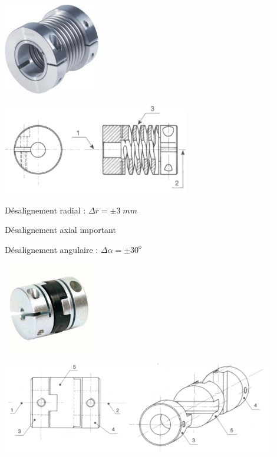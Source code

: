 \documentclass[11pt,oneside]{article}
\begin{document}
\noindent\begin{minipage}[c]{.25\linewidth}
\begin{center}
\includegraphics[height=4cm]{png/fig_15}
\end{center}
\end{minipage} \hfill
\begin{minipage}[c]{.4\linewidth}
\begin{center}
\includegraphics[height=4cm]{png/fig_16}
\end{center}
\end{minipage}\hfill
\begin{minipage}[c]{.25\linewidth}
Désalignement radial : 
$\Delta r = \pm 3\; mm$

Désalignement axial important

Désalignement angulaire : 
$\Delta \alpha = \pm 30^\text{o}$
\end{minipage}


\noindent \begin{minipage}[c]{.2\linewidth}
\begin{center}
\includegraphics[height=4cm]{png/fig_17}
\end{center}
\end{minipage} \hfill
\begin{minipage}[c]{.75\linewidth}
\begin{center}
\includegraphics[height=4cm]{png/fig_18}
\end{center}
\end{minipage}
\end{document}

